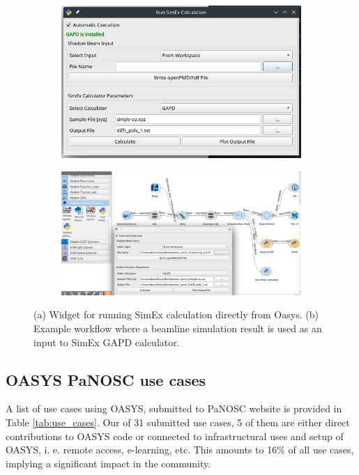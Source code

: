 \documentclass[11pt, a4paper]{article}
\begin{document}
\begin{figure}[htb]
    \centering
    \begin{subfigure}{0.35\textwidth}
        \includegraphics{figures/simexOasysWidget2.png}
        \caption{}
        \label{fig:widget}
    \end{subfigure}
    \hfil
    \begin{subfigure}{0.55\textwidth}
        \includegraphics{figures/simexOasysWidget.png}
        \caption{}
        \label{fig:workflow}
    \end{subfigure}%
    \caption{(a) Widget for running SimEx calculation directly from Oasys. (b) Example workflow where a beamline simulation result is used as an input to SimEx GAPD calculator.}
\end{figure}

\subsection{OASYS PaNOSC use cases}
\label{subsec:panosc_use_cases}
A list of use cases using OASYS, submitted to PaNOSC website is provided in Table \ref{tab:use_cases}. Our of 31 submitted use cases, 5 of them are either direct contributions to OASYS code or connected to infrastructural uses and setup of OASYS, i. e. remote access, e-learning, etc. This amounts to 16\% of all use cases, implying a significant impact in the community.
\end{document}
